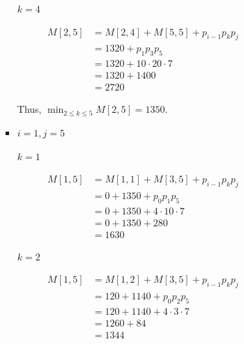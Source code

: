 \documentclass[12pt]{article}
\begin{document}
\begin{enumerate}[1.]
\begin{itemize}
\begin{itemize}
\begin{enumerate}[1.]
\begin{enumerate}[1)]
\begin{itemize}
                        \bigskip

                        \underline{$k = 4$}

                        \begin{align}
                            M[2,5] &= M[2,4] + M[5,5] + p_{i-1}p_kp_j\\
                            &= 1320 + p_1p_3p_5\\
                            &= 1320 + 10 \cdot 20 \cdot 7\\
                            &= 1320 + 1400\\
                            &= 2720
                        \end{align}

                        \bigskip

                        Thus, $\min_{2 \leq k \leq 5} M[2,5] = 1350$.

                        \item $i = 1, j = 5$

                        \bigskip

                        \underline{$k = 1$}

                        \begin{align}
                            M[1,5] &= M[1,1] + M[3,5] + p_{i-1}p_kp_j\\
                            &= 0 + 1350 + p_0p_1p_5\\
                            &= 0 + 1350 + 4 \cdot 10 \cdot 7\\
                            &= 0 + 1350 + 280\\
                            &= 1630
                        \end{align}

                        \bigskip

                        \underline{$k = 2$}

                        \begin{align}
                            M[1,5] &= M[1,2] + M[3,5] + p_{i-1}p_kp_j\\
                            &= 120 + 1140 + p_0p_2p_5\\
                            &= 120 + 1140 + 4 \cdot 3 \cdot 7\\
                            &= 1260 + 84\\
                            &= 1344
                        \end{align}


\end{itemize}
\end{enumerate}
\end{enumerate}
\end{itemize}
\end{itemize}
\end{enumerate}
\end{document}
